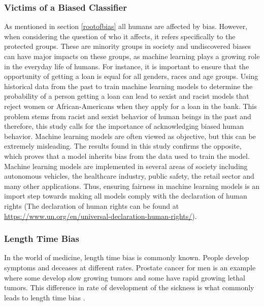 \documentclass[11pt, fleqn, titlepage]{article}
\begin{document}
	\subsubsection{Victims of a Biased Classifier}
	As mentioned in section \ref{rootofbias} all humans are affected by bias. However, when considering the question of who it affects, it refers specifically to the protected groups. These are minority groups in society and undiscovered biases can have major impacts on these groups, as machine learning plays a growing role in the everyday life of humans. For instance, it is important to ensure that the opportunity of getting a loan is equal for all genders, races and age groups. Using historical data from the past to train machine learning models to determine the probability of a person getting a loan can lead to sexist and racist models that reject women or African-Americans when they apply for a loan in the bank. This problem stems from racist and sexist behavior of human beings in the past and therefore, this study calls for the importance of acknowledging biased human behavior. Machine learning models are often viewed as objective, but this can be extremely misleading. The results found in this study confirms the opposite, which proves that a model inherits bias from the data used to train the model. Machine learning models are implemented in several areas of society including autonomous vehicles, the healthcare industry, public safety, the retail sector and many other applications. Thus, ensuring fairness in machine learning models is an import step towards making all models comply with the declaration of human rights (The declaration of human rights can be found at \url{https://www.un.org/en/universal-declaration-human-rights/}).
	
	\subsubsection{Length Time Bias}
	In the world of medicine, length time bias is commonly known. People develop symptoms and deceases at different rates. Prostate cancer for men is  an example where some develop slow growing tumors and some have rapid growing lethal tumors. This difference in rate of development of the sickness is what commonly leads to length time bias \cite{length}.
	
\end{document}
